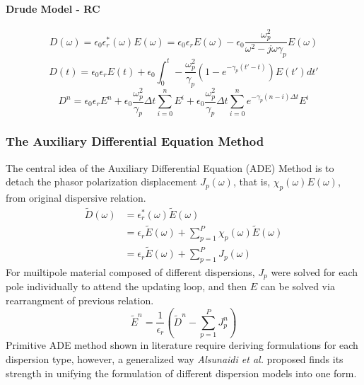 \paragraph{{\msjh Drude Model - RC}}
\begin{equation}
  D(\omega) = \epsilon_0\epsilon_r^*(\omega)E(\omega) = \epsilon_0\epsilon_rE(\omega) - \epsilon_0\frac{\omega_p^2}{\omega^2-j\omega\gamma_p}E(\omega)
\end{equation}
\begin{equation}
  D(t) = \epsilon_0\epsilon_rE(t) + \epsilon_0\int_0^t -\frac{\omega_p^2}{\gamma_p}(1 - e^{-\gamma_p(t'-t)})E(t')dt'
\end{equation}
\begin{equation}
  D^n = \epsilon_0\epsilon_rE^n + \epsilon_0\frac{\omega_p^2}{\gamma_p}\Delta t\sum_{i=0}^{n}E^i + \epsilon_0\frac{\omega_p^2}{\gamma_p}\Delta t \sum_{i=0}^{n}e^{-\gamma_p(n-i)\Delta t} E^i
\end{equation}



\subsubsection{The Auxiliary Differential Equation Method}
The central idea of the Auxiliary Differential Equation (ADE) Method is to detach the phasor polarization displacement
$J_p(\omega)$, that is, $\chi_p(\omega)E(\omega)$, from original dispersive relation.
\begin{equation}
  \begin{split}
    \widetilde{D}(\omega) &= \epsilon_r^*(\omega)\widetilde{E}(\omega)\\
    & = \epsilon_r\widetilde{E}(\omega) + \sum_{p=1}^P\chi_p(\omega)\widetilde{E}(\omega)\\
    & = \epsilon_r\widetilde{E}(\omega) + \sum_{p=1}^{P}J_p(\omega)
  \end{split}
\end{equation}
For muiltipole material composed of different dispersions, $J_p$ were solved for each pole individually to attend the
updating loop, and then $E$ can be solved via rearrangment of previous relation.
\begin{equation}
  \widetilde{E}^n = \frac{1}{\epsilon_r}\left(\widetilde{D}^n - \sum_{p=1}^PJ_p^n\right)
\end{equation}
Primitive ADE method shown in literature require deriving formulations for each dispersion type, however, a generalized
way \textit{Alsunaidi et al.} proposed finds its strength in unifying the formulation of different dispersion models
into one form.

